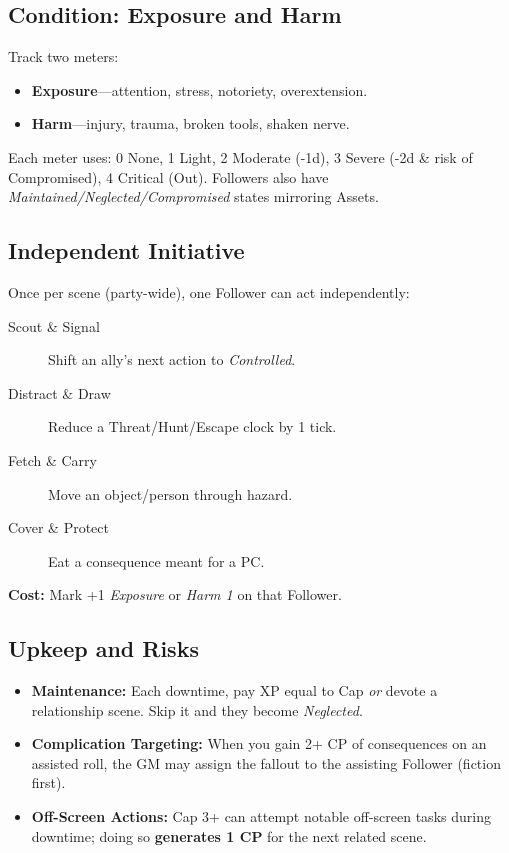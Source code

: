 \begin{multicols}{2}
\subsection*{Condition: Exposure and Harm}
Track two meters:
\begin{itemize}
  \item \textbf{Exposure}—attention, stress, notoriety, overextension.
  \item \textbf{Harm}—injury, trauma, broken tools, shaken nerve.
\end{itemize}
Each meter uses: 0 None, 1 Light, 2 Moderate (-1d), 3 Severe (-2d \& risk of Compromised), 4 Critical (Out). Followers also have \emph{Maintained/Neglected/Compromised} states mirroring Assets.

\subsection*{Independent Initiative}
Once per scene (party-wide), one Follower can act independently:
\begin{description}
  \item[Scout \& Signal] Shift an ally’s next action to \emph{Controlled}.
  \item[Distract \& Draw] Reduce a Threat/Hunt/Escape clock by 1 tick.
  \item[Fetch \& Carry] Move an object/person through hazard.
  \item[Cover \& Protect] Eat a consequence meant for a PC.
\end{description}
\textbf{Cost:} Mark +1 \emph{Exposure} or \emph{Harm 1} on that Follower.

\subsection*{Upkeep and Risks}
\begin{itemize}
  \item \textbf{Maintenance:} Each downtime, pay XP equal to Cap \emph{or} devote a relationship scene. Skip it and they become \emph{Neglected}.
  \item \textbf{Complication Targeting:} When you gain 2+ CP of consequences on an assisted roll, the GM may assign the fallout to the assisting Follower (fiction first).
  \item \textbf{Off-Screen Actions:} Cap 3+ can attempt notable off-screen tasks during downtime; doing so \textbf{generates 1 CP} for the next related scene.
\end{itemize}


\end{multicols}
